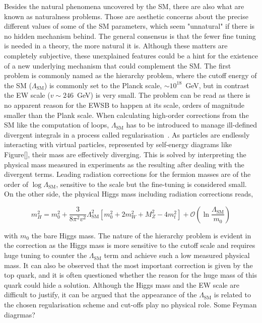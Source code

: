 Besides the natural phenomena uncovered by the SM, there are also what are known as naturalness problems. Those are aesthetic concerns about the precise different values of some of the SM parameters, which seem "unnatural" if there is no hidden mechanism behind. The general consensus is that the fewer fine tuning is needed in a theory, the more natural it is. Although these matters are completely subjective, these unexplained features could be a hint for the existence of a new underlying mechanism that could complement the SM. The first problem is commonly named as the hierarchy problem, where the cutoff energy of the SM ($\Lambda_{\text{SM}}$) is commonly set to the Planck scale, $\sim10^{18}$~GeV, but in contrast the EW scale ($v\sim246$~GeV) is very small. The problem can be read as there is no apparent reason for the EWSB to happen at its scale, orders of magnitude smaller than the Plank scale. When calculating high-order corrections from the SM like the computation of loops, $\Lambda_{\text{SM}}$ has to be introduced to manage ill-defined divergent integrals in a process called regularisation~\cite{}. As particles are endlessly interacting with virtual particles, represented by self-energy diagrams like Figure[], their mass are effectively diverging. This is solved by interpreting the physical mass measured in experiments as the resulting after dealing with the divergent terms. Leading radiation corrections for the fermion masses are of the order of $\log\Lambda_{\text{SM}}$, sensitive to the scale but the fine-tuning is considered small. On the other side, the physical Higgs mass including radiation corrections reads,

\begin{equation}
    m^2_H = m_0^2 + \frac{3}{8\pi^2v^2}\Lambda_{\text{SM}}^2 [ m_0^2 + 2m_W^2 + M_Z^2 - 4m_t^2] + \mathcal{O}(\ln\frac{\Lambda_{\text{SM}}}{m_0})
\end{equation}

with $m_0$ the bare Higgs mass. The nature of the hierarchy problem is evident in the correction as the Higgs mass is more sensitive to the cutoff scale and requires huge tuning to counter the $\Lambda_{\text{SM}}$ term and achieve such a low measured physical mass. It can also be observed that the most important correction is given by the top quark, and it is often questioned whether the reason for the huge mass of this quark could hide a solution. Although the Higgs mass and the EW scale are difficult to justify, it can be argued that the appearance of the $\Lambda_{\text{SM}}$ is related to the chosen regularisation scheme and cut-offs play no physical role. 
Some Feyman diagrmas?

